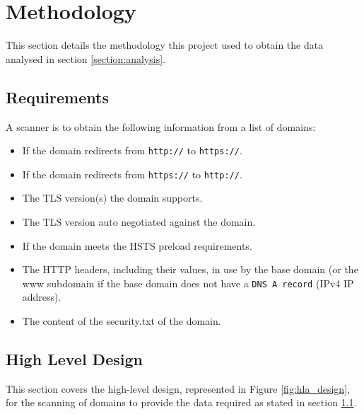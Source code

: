 \documentclass{mscreport}
\begin{document}
\clearpage
\newpage

\section{Methodology}
\label{section:methodology}

This section details the methodology this project used to obtain the data analysed in section \ref{section:analysis}.

\subsection{Requirements}
\label{subsection:requirements}

A scanner is to obtain the following information from a list of domains:

\begin{itemize}
	\setlength\itemsep{0.1em}
    \item If the domain redirects from \texttt{http://} to \texttt{https://}.
    \item If the domain redirects from \texttt{https://} to \texttt{http://}.
    \item The TLS version(s) the domain supports.
    \item The TLS version auto negotiated against the domain.
    \item If the domain meets the HSTS preload requirements.
    \item The HTTP headers, including their values, in use by the base domain (or the www subdomain if the base domain does not have a \texttt{DNS A record} (IPv4 IP address).
    \item The content of the security.txt of the domain.
\end{itemize}

\subsection{High Level Design}
\label{subsection:hld}

This section covers the high-level design, represented in Figure \ref{fig:hla_design}, for the scanning of domains to provide the data required as stated in section
\ref{subsection:requirements}. 

\end{document}
